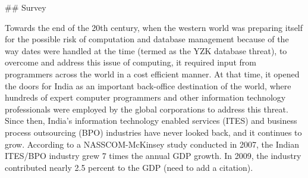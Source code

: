 ## Survey 

Towards the end of the 20th century, when the western world was preparing itself for the possible risk of computation and database management because of the way dates were handled at the time (termed as the YZK database threat), to overcome and address this issue of computing, it required input from programmers across the world in a cost efficient manner. At that time, it opened the doors for India as an important back-office destination of the world, where hundreds of expert computer programmers and other information technology professionals were employed by the global corporations to address this threat. Since then, India's information technology enabled services (ITES) and business process outsourcing (BPO) industries  have never looked back, and it continues to grow. According to a NASSCOM-McKinsey study  conducted in 2007, the Indian ITES/BPO industry grew 7 times the annual GDP growth. In 2009, the industry contributed nearly 2.5 percent to the GDP (need to add a citation).

    
    
    